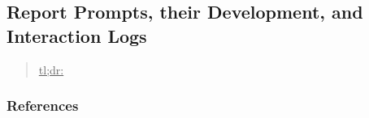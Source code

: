 



\subsection{Report Prompts, their Development, and Interaction Logs}
\label{sec:report-prompts-their-development-and-interaction-logs}

\begin{quote}
\underline{tl;dr:} 
\end{quote}



\subsubsection{References}





